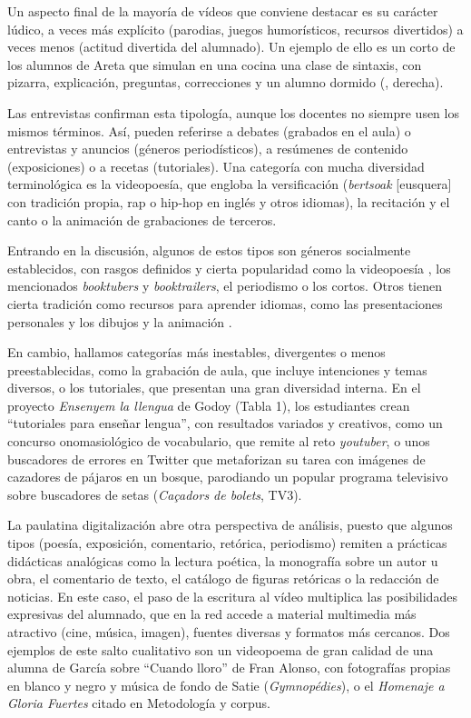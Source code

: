 \documentclass[spanish]{textolivre}
\begin{document}
Un aspecto final de la mayoría de vídeos que conviene destacar es su carácter lúdico, a veces más explícito (parodias, juegos humorísticos, recursos divertidos) a veces menos (actitud divertida del alumnado). Un ejemplo de ello es un corto de los alumnos de Areta que simulan en una cocina una clase de sintaxis, con pizarra, explicación, preguntas, correcciones y un alumno dormido (, derecha).

Las entrevistas confirman esta tipología, aunque los docentes no siempre usen los mismos términos. Así, pueden referirse a debates (grabados en el aula) o entrevistas y anuncios (géneros periodísticos), a resúmenes de contenido (exposiciones) o a recetas (tutoriales). Una categoría con mucha diversidad terminológica es la videopoesía, que engloba la versificación (\textit{bertsoak} [eusquera] con tradición propia, rap o hip-hop en inglés y otros idiomas), la recitación y el canto o la animación de grabaciones de terceros.

Entrando en la discusión, algunos de estos tipos son géneros socialmente establecidos, con rasgos definidos y cierta popularidad como la videopoesía \cite{aliagas_rapping_2016}, los mencionados \textit{booktubers} y \textit{booktrailers}, el periodismo o los cortos. Otros tienen cierta tradición como recursos para aprender idiomas, como las presentaciones personales y los dibujos y la animación \cite{shafirova_identity_2020}.

En cambio, hallamos categorías más inestables, divergentes o menos preestablecidas, como la grabación de aula, que incluye intenciones y temas diversos, o los tutoriales, que presentan una gran diversidad interna. En el proyecto \textit{Ensenyem la llengua} de Godoy (Tabla 1), los estudiantes crean “tutoriales para enseñar lengua”, con resultados variados y creativos, como un concurso onomasiológico de vocabulario, que remite al reto \textit{youtuber}, o unos buscadores de errores en Twitter que metaforizan su tarea con imágenes de cazadores de pájaros en un bosque, parodiando un popular programa televisivo sobre buscadores de setas (\textit{Caçadors de bolets}, TV3).

La paulatina digitalización abre otra perspectiva de análisis, puesto que algunos tipos (poesía, exposición, comentario, retórica, periodismo) remiten a prácticas didácticas analógicas como la lectura poética, la monografía sobre un autor u obra, el comentario de texto, el catálogo de figuras retóricas o la redacción de noticias. En este caso, el paso de la escritura al vídeo multiplica las posibilidades expresivas del alumnado, que en la red accede a material multimedia más atractivo (cine, música, imagen), fuentes diversas y formatos más cercanos. Dos ejemplos de este salto cualitativo son un videopoema de gran calidad de una alumna de García sobre “Cuando lloro” de Fran Alonso, con fotografías propias en blanco y negro y música de fondo de Satie (\textit{Gymnopédies}), o el \textit{Homenaje a Gloria Fuertes} citado en Metodología y corpus.
\end{document}
